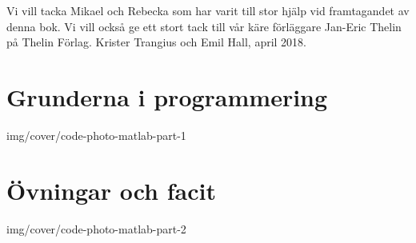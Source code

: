\documentclass[14pt]{extbook}
\begin{document}
Vi vill tacka Mikael och Rebecka som har varit till stor hjälp vid framtagandet av denna bok. Vi vill också ge ett stort tack till vår käre förläggare Jan-Eric Thelin på Thelin Förlag.
\newline
\newline
Krister Trangius och Emil Hall, april 2018.
\newpage
{}
\renewcommand{\thechapter}{\Alph{chapter}}%

\setcounter{page}{1}
\tableofcontents %


\pagestyle{fancy} %



\thispagestyle{plain} %
\part{Grunderna i programmering}{img/cover/code-photo-matlab-part-1}

\mainmatter
\renewcommand{\thechapter}{\arabic{chapter}}%
\setcounter{chapter}{0}%

\pagestyle{fancy} %

\thispagestyle{plain} %
\part{Övningar och facit}{img/cover/code-photo-matlab-part-2}

\pagestyle{fancy} %



\printindex
\end{document}
